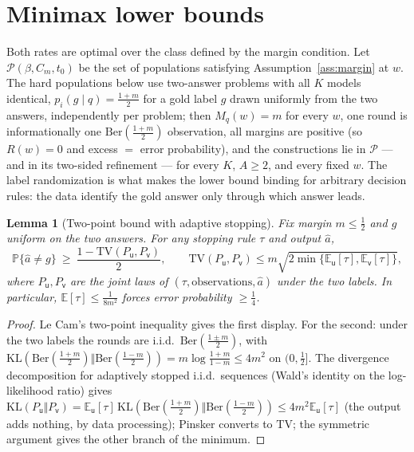 \documentclass[11pt]{article}
\newtheorem{lemma}{Lemma}
\newcommand{\E}{\mathbb E}
\newcommand{\Pp}{\mathbb P}
\newcommand{\wfix}{w}
\newcommand{\TV}{\mathrm{TV}}
\newcommand{\KL}{\mathrm{KL}}
\newcommand{\Ber}{\mathrm{Ber}}
\newcommand{\class}{\mathcal P}
\begin{document}
\section{Minimax lower bounds}
\label{sec:lower}

Both rates are optimal over the class defined by the margin condition.  Let
$\class(\beta,C_m,t_0)$ be the set of populations satisfying
Assumption~\ref{ass:margin} at $\wfix$.  The hard populations below use
two-answer problems with all $K$ models identical,
$p_i(g\mid q)=\frac{1+m}{2}$ for a gold label $g$ drawn uniformly from the
two answers, independently per problem; then $M_q(\wfix)=m$ for every
$\wfix$, one round is informationally one $\Ber(\frac{1+m}{2})$ observation,
all margins are positive (so $R(\wfix)=0$ and excess $=$ error probability),
and the constructions lie in $\class$ --- and in its two-sided refinement ---
for every $K$, $A\ge2$, and every fixed $\wfix$.  The label randomization is
what makes the lower bound binding for arbitrary decision rules: the data
identify the gold answer only through which answer leads.

\begin{lemma}[Two-point bound with adaptive stopping]
\label{lem:lecam}
Fix margin $m\le\frac12$ and $g$ uniform on the two answers.  For any
stopping rule $\tau$ and output $\widehat a$,
\[
\Pp\{\widehat a\ne g\}
\ \ge\
\frac{1-\TV(P_{\mathsf u},P_{\mathsf v})}{2},
\qquad
\TV(P_{\mathsf u},P_{\mathsf v})
\le
m\sqrt{2\min\{\E_{\mathsf u}[\tau],\E_{\mathsf v}[\tau]\}},
\]
where $P_{\mathsf u},P_{\mathsf v}$ are the joint laws of
$(\tau,\text{observations},\widehat a)$ under the two labels.  In
particular, $\E[\tau]\le\frac{1}{8m^2}$ forces error probability
$\ge\frac14$.
\end{lemma}

\begin{proof}
Le Cam's two-point inequality gives the first display.  For the second:
under the two labels the rounds are i.i.d.\ $\Ber(\frac{1\pm m}{2})$, with
$\KL(\Ber(\tfrac{1+m}{2})\Vert\Ber(\tfrac{1-m}{2}))
=m\log\frac{1+m}{1-m}\le4m^2$ on $(0,\frac12]$.  The divergence
decomposition for adaptively stopped i.i.d.\ sequences (Wald's identity on
the log-likelihood ratio) gives
$\KL(P_{\mathsf u}\Vert P_{\mathsf v})=\E_{\mathsf u}[\tau]\,
\KL(\Ber(\tfrac{1+m}{2})\Vert\Ber(\tfrac{1-m}{2}))\le4m^2\E_{\mathsf
u}[\tau]$ (the output adds nothing, by data processing); Pinsker converts
to $\TV$; the symmetric argument gives the other branch of the minimum.
\end{proof}
\end{document}
